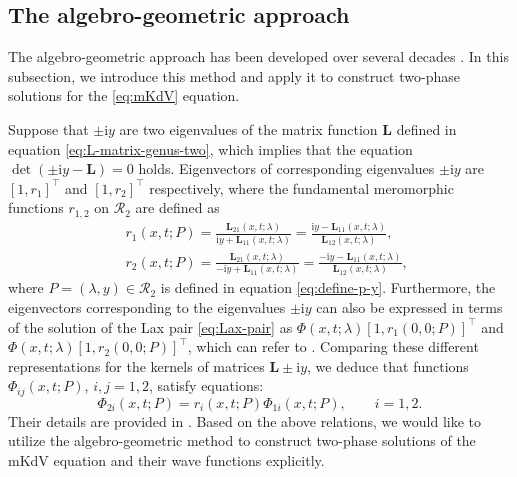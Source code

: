 \documentclass[11pt,reqno]{amsart}
\newcommand{\ii}{\mathrm{i}}
\numberwithin{equation}{section}
\begin{document}
\subsection{The algebro-geometric approach}\label{sec:algebro-geometric-approach}
The algebro-geometric approach has been developed over several decades \cite{BelokolosBEI-94,FritzH-2003-Algebro-Geometric}. 
In this subsection, we introduce this method and apply it to construct two-phase solutions for the \ref{eq:mKdV} equation.

Suppose that $\pm \ii y$ are two eigenvalues of the matrix function $\mathbf{L}$ defined in equation \eqref{eq:L-matrix-genus-two}, which implies that the equation $\det\left(\pm \ii y -\mathbf{L}\right)=0$ holds. 
Eigenvectors of corresponding eigenvalues $\pm \ii y$ are $[1, r_1]^{\top}$ and $[1, r_2]^{\top}$ respectively, where the fundamental meromorphic functions $r_{1,2}$ on $\mathcal{R}_2$ are defined as 
\begin{equation}\label{eq:define-r-12}
	\begin{split}
		&\ r_1(x,t;P)=\frac{\mathbf{L}_{21}(x,t;\lambda)}{\ii y+\mathbf{L}_{11}(x,t;\lambda)}=\frac{\ii y-\mathbf{L}_{11}(x,t;\lambda)}{\mathbf{L}_{12}(x,t;\lambda)}, \\
		&\ r_2(x,t;P)=\frac{\mathbf{L}_{21}(x,t;\lambda)}{-\ii y+\mathbf{L}_{11}(x,t;\lambda)}=\frac{-\ii y-\mathbf{L}_{11}(x,t;\lambda)}{\mathbf{L}_{12}(x,t;\lambda)}, 
	\end{split}
\end{equation}
where $P=(\lambda,y)\in \mathcal{R}_2$ is defined in equation \eqref{eq:define-p-y}.
Furthermore, the eigenvectors corresponding to the eigenvalues  $\pm \ii y$ can also be expressed in terms of the solution of the Lax pair \eqref{eq:Lax-pair} as $\Phi(x,t;\lambda)[1, r_1(0,0;P)]^{\top}$ and $\Phi(x,t;\lambda)[1, r_2(0,0;P)]^{\top}$, which can refer to \cite{LingS-23-mKdV-stability}.
Comparing these different representations for the kernels of matrices $\mathbf{L}\pm \ii y $, we deduce that functions $\Phi_{ij}(x,t;P)$, $i,j=1,2$, satisfy equations:
\begin{equation}\label{eq:relation-Phi-r}
	\Phi_{2i}(x,t;P)=r_i(x,t;P)\Phi_{1i}(x,t;P), \qquad i=1,2.
\end{equation}
Their details are provided in \cite{FengLT-20,LingS-23-mKdV-stability}.
Based on the above relations, we would like to utilize the algebro-geometric method to construct two-phase solutions of the mKdV equation and their wave functions explicitly.
\end{document}
